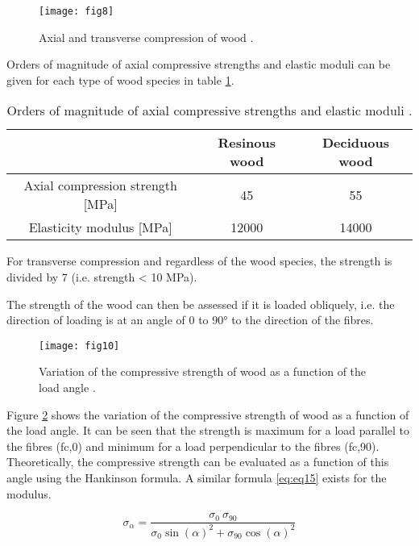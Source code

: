 \begin{figure}[htp]
	\centering
	\texttt{[image: fig8]}
	\caption{Axial and transverse compression of wood \citep{Taazount2021}.}
	\label{fig:fig8}
\end{figure}

Orders of magnitude of axial compressive strengths and elastic moduli can be given for each type of wood species in table \ref{fig:fig9}. 

\begin{table} \centering
	\begin{tabular}{ccc}
		\toprule %
		& Resinous wood & Deciduous wood  \\\midrule
		Axial compression strength [\unit{\mega\pascal}] & 45
		& 55 \\\midrule
		Elasticity modulus [\unit{\mega\pascal}] & 12000
		& 14000 \\
		\bottomrule %
	\end{tabular}
	\caption{Orders of magnitude of axial compressive strengths and elastic moduli \citep{Taazount2021}.}
	\label{fig:fig9}
\end{table}


For transverse compression and regardless of the wood species, the strength is divided by 7 (i.e. strength < 10 MPa). 

The strength of the wood can then be assessed if it is loaded obliquely, i.e. the direction of loading is at an angle of 0 to 90° to the direction of the fibres. 


\begin{figure}[htp]
	\centering
	\texttt{[image: fig10]}
	\caption{Variation of the compressive strength of wood as a function of the load angle \citep{Taazount2021}.}
	\label{fig:fig10}
\end{figure}

Figure \ref{fig:fig10} shows the variation of the compressive strength of wood as a function of the load angle. It can be seen that the strength is maximum for a load parallel to the fibres (fc,0) and minimum for a load perpendicular to the fibres (fc,90). Theoretically, the compressive strength can be evaluated as a function of this angle using the Hankinson formula. A similar formula \ref{eq:eq15} exists for the modulus.

\begin{equation}
	\sigma_{\alpha} = \frac{\sigma_{0}~\sigma_{90}}{\sigma_{0} \sin(\alpha)^2+\sigma_{90} \cos(\alpha)^2}
	\label{eq:eq15}
\end{equation}


